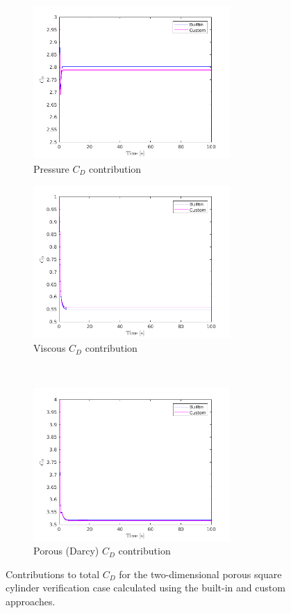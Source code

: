 \documentclass[a4paper,11pt]{report}
\begin{document}
\begin{figure}[ht]
    \centering
    \begin{subfigure}[b]{75mm}
        \includegraphics[width=75mm]{"pressure_x.png"}
        \caption{Pressure $C_D$ contribution}
        \label{fig:pty075_Da1e-2}
    \end{subfigure}
    \begin{subfigure}[b]{75mm}
        \includegraphics[width=75mm]{"viscous_x.png"}
        \caption{Viscous $C_D$ contribution}
        \label{fig:pty075_Da1e-4}
    \end{subfigure}
    \\
    \begin{subfigure}[b]{75mm}
        \includegraphics[width=75mm]{"porous_x.png"}
        \caption{Porous (Darcy) $C_D$ contribution}
        \label{fig:pty095_Da1e-2}
    \end{subfigure}
    \caption{Contributions to total $C_D$ for the two-dimensional porous square cylinder verification case calculated using the built-in and custom approaches.}\label{fig:forcesConventional_verification1}
\end{figure}
\end{document}
